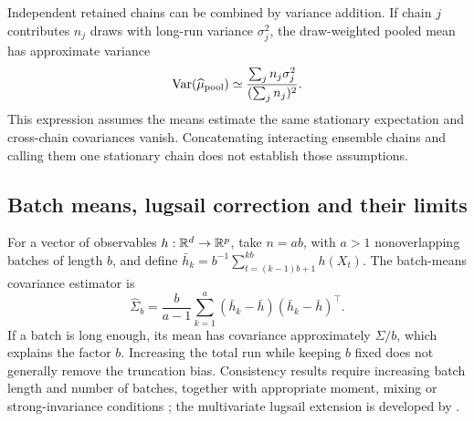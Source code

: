 Independent retained chains can be combined by variance addition. If chain
$j$ contributes $n_j$ draws with long-run variance $\sigma_j^2$, the
draw-weighted pooled mean has approximate variance
\begin{equation}
 \operatorname{Var}(\widehat\mu_{\rm pool})
   \simeq \frac{\sum_j n_j\sigma_j^2}{(\sum_j n_j)^2}.
 \label{eq:bf-modern-pooled-mcse}
\end{equation}
This expression assumes the means estimate the same stationary expectation
and cross-chain covariances vanish. Concatenating interacting ensemble chains
and calling them one stationary chain does not establish those assumptions.

\subsection{Batch means, lugsail correction and their limits}

For a vector of observables $h:\mathbb{R}^d\to\mathbb{R}^p$, take $n=ab$, with $a>1$
nonoverlapping batches of length $b$,
and define $\bar h_k=b^{-1}\sum_{t=(k-1)b+1}^{kb}h(X_t)$.
The batch-means covariance estimator is
\begin{equation}
 \widehat\Sigma_b=\frac{b}{a-1}
       \sum_{k=1}^a(\bar h_k-\bar h)(\bar h_k-\bar h)^\top.
 \label{eq:bf-modern-batch-means}
\end{equation}
If a batch is long enough, its mean has covariance approximately $\Sigma/b$,
which explains the factor $b$. Increasing the total run while keeping $b$
fixed does not generally remove the truncation bias. Consistency results
require increasing batch length and number of batches, together with
appropriate moment, mixing or strong-invariance conditions
\citep[Section 3]{flegal2010batchmeans}; the multivariate lugsail extension
is developed by \citet{vats2021lugsail}.

